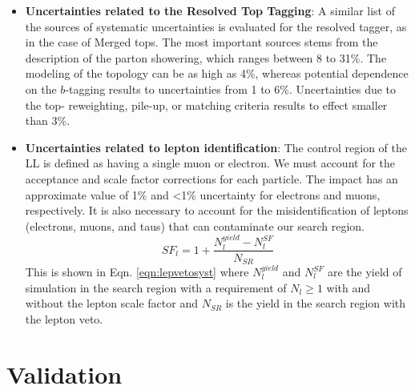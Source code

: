 \begin{itemize}
	\item \textbf{Uncertainties related to the Resolved Top Tagging}: A similar list of the sources of systematic uncertainties is evaluated for the resolved tagger, as in the case of Merged tops. The most important sources stems from the description of the parton showering, which ranges between 8 to 31\%. The modeling of the \ttbar{} topology can be as high as 4\%, whereas potential dependence on the $b$-tagging results to uncertainties from 1 to 6\%. Uncertainties due to the top-\pt{} reweighting, pile-up, or matching criteria results to effect smaller than 3\%. 
	\item \textbf{Uncertainties related to lepton identification}: The control region of the LL is defined as having a single muon or electron. We must account for the acceptance and scale factor corrections for each particle. The impact has an approximate value of 1\%  and <1\% uncertainty for electrons and muons, respectively. It is also necessary to account for the misidentification of leptons (electrons, muons, and taus) that can contaminate our search region. 
	\begin{equation}\label{eqn:lepvetosyst}
		SF_{l}=1+\frac{N_l^{yield}-N_l^{SF}}{N_{SR}}
	\end{equation}
	This is shown in Eqn. \ref{eqn:lepvetosyst} where $N_l^{yield}$ and $N_l^{SF}$ are  the yield of simulation in the search region with a requirement of $N_l\geq1$ with and without the lepton scale factor and $N_{SR}$ is the yield in the search region with the lepton veto.  
\end{itemize}

\section{Validation}\label{sec:Validation}



